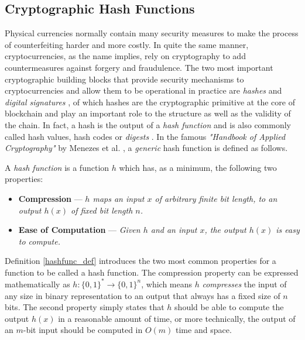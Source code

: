 



\subsection{Cryptographic Hash Functions} \label{subsec:hashfunc}

Physical currencies normally contain many security measures to make the process of counterfeiting harder and more costly. In quite the same manner, cryptocurrencies, as the name implies, rely on cryptography to add countermeasures against forgery and fraudulence. The two most important cryptographic building blocks that provide security mechanisms to cryptocurrencies and allow them to be operational in practice are \textit{hashes} and \textit{digital signatures} \cite{narayanan2016bitcoin}, of which hashes are the cryptographic primitive at the core of blockchain and play an important role to the structure as well as the validity of the chain. In fact, a hash is the output of a \textit{hash function} and is also commonly called hash values, hash codes or \textit{digests} \cite{enwiki:1029031919}. In the famous \textit{"Handbook of Applied Cryptography"} by Menezes et al. \cite{menezes1997handbook}, a \textit{generic} hash function is defined as follows.

\begin{definition}\label{hashfunc_def}
A \textit{hash function} is a function $h$ which has, as a minimum, the following two properties:
\begin{itemize}
    \item \textbf{Compression} --- \textit{$h$ maps an input $x$ of arbitrary finite bit length, to an output $h(x)$ of fixed bit length $n$.}
    \item \textbf{Ease of Computation} --- \textit{Given $h$ and an input $x$, the output $h(x)$ is easy to compute.}
\end{itemize}
\end{definition}

Definition \ref{hashfunc_def} introduces the two most common properties for a function to be called a hash function. The compression property can be expressed mathematically as $h: \{0,1\}^{*} \rightarrow \{0,1\}^n$, which means $h$ \textit{compresses} the input of any size in binary representation to an output that always has a fixed size of $n$ bits. The second property simply states that $h$ should be able to compute the output $h(x)$ in a reasonable amount of time, or more technically, the output of an $m$-bit input should be computed in $O(m)$ time and space.

